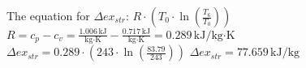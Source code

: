 The equation for \( \Delta ex_{str} \):  
\( R \cdot \left( T_0 \cdot \ln \left( \frac{T_6}{T_0} \right) \right) \)  
\( R = c_p - c_v = \frac{1.006 \, \text{kJ}}{\text{kg} \cdot \text{K}} - \frac{0.717 \, \text{kJ}}{\text{kg} \cdot \text{K}} = 0.289 \, \text{kJ/kg·K} \)  
\( \Delta ex_{str} = 0.289 \cdot \left( 243 \cdot \ln \left( \frac{83.79}{243} \right) \right) \)  
\( \Delta ex_{str} = 77.659 \, \text{kJ/kg} \)